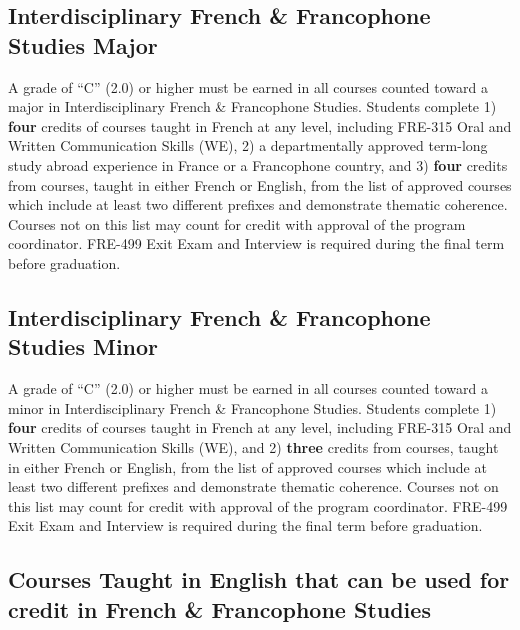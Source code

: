 \documentclass[
  letterpaper,
]{scrbook}
\begin{document}
\subsection{Interdisciplinary French \& Francophone Studies
Major}\label{interdisciplinary-french-francophone-studies-major}

A grade of ``C'' (2.0) or higher must be earned in all courses counted
toward a major in Interdisciplinary French \& Francophone Studies.
Students complete 1) \textbf{four} credits of courses taught in French
at any level, including FRE-315 Oral and Written Communication Skills
(WE), 2) a departmentally approved term-long study abroad experience in
France or a Francophone country, and 3) \textbf{four} credits from
courses, taught in either French or English, from the list of approved
courses which include at least two different prefixes and demonstrate
thematic coherence. Courses not on this list may count for credit with
approval of the program coordinator. FRE-499 Exit Exam and Interview is
required during the final term before graduation.

\subsection{Interdisciplinary French \& Francophone Studies
Minor}\label{interdisciplinary-french-francophone-studies-minor}

A grade of ``C'' (2.0) or higher must be earned in all courses counted
toward a minor in Interdisciplinary French \& Francophone Studies.
Students complete 1) \textbf{four} credits of courses taught in French
at any level, including FRE-315 Oral and Written Communication Skills
(WE), and 2) \textbf{three} credits from courses, taught in either
French or English, from the list of approved courses which include at
least two different prefixes and demonstrate thematic coherence. Courses
not on this list may count for credit with approval of the program
coordinator. FRE-499 Exit Exam and Interview is required during the
final term before graduation.

\subsection{Courses Taught in English that can be used for credit in
French \& Francophone
Studies}\label{courses-taught-in-english-that-can-be-used-for-credit-in-french-francophone-studies}
\end{document}
